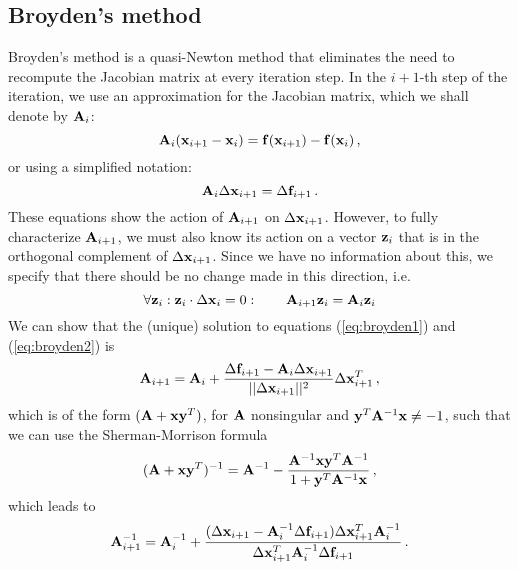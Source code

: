     \subsection{Broyden's method}
        Broyden's method \cite{Burden2011, broyden1965} is a quasi-Newton method that eliminates the need to recompute the Jacobian matrix at every iteration step. In the $i+1$-th step of the iteration, we use an approximation for the Jacobian matrix, which we shall denote by $\vb{A}_i$:
        \begin{equation}
            \vb{A}_i (\vb{x}_{i+1} - \vb{x}_i) = \vb{f}(\vb{x}_{i+1}) - \vb{f}(\vb{x}_i) \thinspace ,
        \end{equation}
        or using a simplified notation:
        \begin{equation} \label{eq:broyden1}
            \vb{A}_i \Delta \vb{x}_{i+1} = \Delta \vb{f}_{i+1} \thinspace .
        \end{equation}
        These equations show the action of $\vb{A}_{i+1}$ on $\Delta \vb{x}_{i+1}$. However, to fully characterize $\vb{A}_{i+1}$, we must also know its action on a vector $\vb{z}_i$ that is in the orthogonal complement of $\Delta \vb{x}_{i+1}$. Since we have no information about this, we specify that there should be no change made in this direction, i.e.
        \begin{equation} \label{eq:broyden2}
            \forall \vb{z}_i: \vb{z}_i \cdot \Delta \vb{x}_{i} = 0: \qquad \vb{A}_{i+1} \vb{z}_i = \vb{A}_i \vb{z}_i
        \end{equation}
        We can show that the (unique) solution to equations (\ref{eq:broyden1}) and (\ref{eq:broyden2}) is
        \begin{equation}
            \vb{A}_{i+1} = \vb{A}_i + \frac{\Delta \vb{f}_{i+1} - \vb{A}_i \Delta \vb{x}_{i+1}}{|| \Delta \vb{x}_{i+1} ||^2} \Delta \vb{x}_{i+1}^T \thinspace ,
        \end{equation}
        which is of the form $(\vb{A} + \vb{x} \vb{y}^T)$, for $\vb{A}$ nonsingular and $\vb{y}^T \vb{A}^{-1} \vb{x} \neq -1$, such that we can use the Sherman-Morrison formula \cite{Burden2011}
        \begin{equation}
            (\vb{A} + \vb{x} \vb{y}^T)^{-1} = \vb{A}^{-1} - \frac{\vb{A}^{-1} \vb{x} \vb{y}^T \vb{A}^{-1}}{1 + \vb{y}^T \vb{A}^{-1} \vb{x}} \thinspace ,
        \end{equation}
        which leads to
        \begin{equation} \label{eq:broyden_A_update}
            \vb{A}_{i+1}^{-1} = \vb{A}_i^{-1} + \frac{(\Delta \vb{x}_{i+1} - \vb{A}^{-1}_i \Delta \vb{f}_{i+1}) \Delta \vb{x}_{i+1}^T \vb{A}_i^{-1}}{\Delta \vb{x}^T_{i+1} \vb{A}^{-1}_i \Delta \vb{f}_{i+1}} \thinspace .
        \end{equation}
